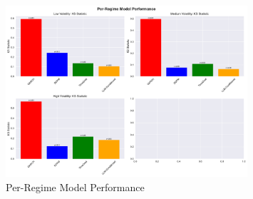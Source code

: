 \begin{figure}[htbp]
\centering
\includegraphics[width=0.8\textwidth]{figures/per_regime_analysis.pdf}
\caption{Per-Regime Model Performance}
\label{fig:perregimeanalysis}
\end{figure}